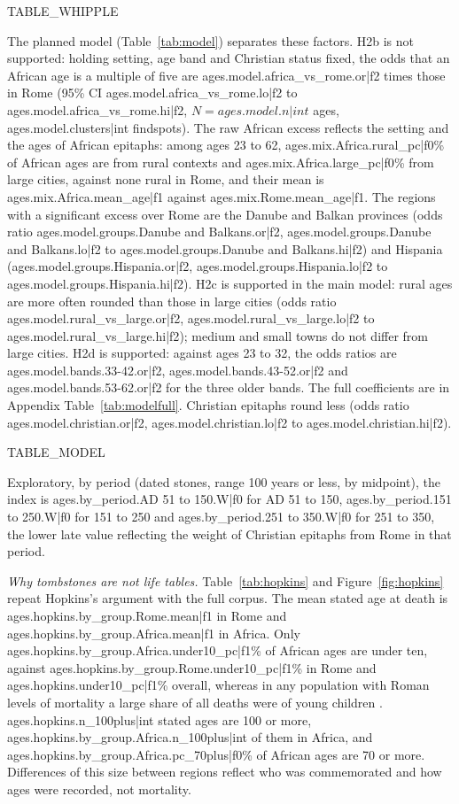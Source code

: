 {{TABLE_WHIPPLE}}

The planned model (Table~\ref{tab:model}) separates these factors. H2b is not supported: holding setting, age band and Christian status fixed, the odds that an African age is a multiple of five are {{ages.model.africa_vs_rome.or|f2}} times those in Rome (95\% CI {{ages.model.africa_vs_rome.lo|f2}} to {{ages.model.africa_vs_rome.hi|f2}}, $N = {{ages.model.n|int}}$ ages, {{ages.model.clusters|int}} findspots). The raw African excess reflects the setting and the ages of African epitaphs: among ages 23 to 62, {{ages.mix.Africa.rural_pc|f0}}\% of African ages are from rural contexts and {{ages.mix.Africa.large_pc|f0}}\% from large cities, against none rural in Rome, and their mean is {{ages.mix.Africa.mean_age|f1}} against {{ages.mix.Rome.mean_age|f1}}. The regions with a significant excess over Rome are the Danube and Balkan provinces (odds ratio {{ages.model.groups.Danube and Balkans.or|f2}}, {{ages.model.groups.Danube and Balkans.lo|f2}} to {{ages.model.groups.Danube and Balkans.hi|f2}}) and Hispania ({{ages.model.groups.Hispania.or|f2}}, {{ages.model.groups.Hispania.lo|f2}} to {{ages.model.groups.Hispania.hi|f2}}). H2c is supported in the main model: rural ages are more often rounded than those in large cities (odds ratio {{ages.model.rural_vs_large.or|f2}}, {{ages.model.rural_vs_large.lo|f2}} to {{ages.model.rural_vs_large.hi|f2}}); medium and small towns do not differ from large cities. H2d is supported: against ages 23 to 32, the odds ratios are {{ages.model.bands.33-42.or|f2}}, {{ages.model.bands.43-52.or|f2}} and {{ages.model.bands.53-62.or|f2}} for the three older bands. The full coefficients are in Appendix Table~\ref{tab:modelfull}. Christian epitaphs round less (odds ratio {{ages.model.christian.or|f2}}, {{ages.model.christian.lo|f2}} to {{ages.model.christian.hi|f2}}).

{{TABLE_MODEL}}

Exploratory, by period (dated stones, range 100 years or less, by midpoint), the index is {{ages.by_period.AD 51 to 150.W|f0}} for AD 51 to 150, {{ages.by_period.151 to 250.W|f0}} for 151 to 250 and {{ages.by_period.251 to 350.W|f0}} for 251 to 350, the lower late value reflecting the weight of Christian epitaphs from Rome in that period.

\textit{Why tombstones are not life tables.} Table~\ref{tab:hopkins} and Figure~\ref{fig:hopkins} repeat Hopkins's argument with the full corpus. The mean stated age at death is {{ages.hopkins.by_group.Rome.mean|f1}} in Rome and {{ages.hopkins.by_group.Africa.mean|f1}} in Africa. Only {{ages.hopkins.by_group.Africa.under10_pc|f1}}\% of African ages are under ten, against {{ages.hopkins.by_group.Rome.under10_pc|f1}}\% in Rome and {{ages.hopkins.under10_pc|f1}}\% overall, whereas in any population with Roman levels of mortality a large share of all deaths were of young children \citep{hopkins1966,scheidel2001}. {{ages.hopkins.n_100plus|int}} stated ages are 100 or more, {{ages.hopkins.by_group.Africa.n_100plus|int}} of them in Africa, and {{ages.hopkins.by_group.Africa.pc_70plus|f0}}\% of African ages are 70 or more. Differences of this size between regions reflect who was commemorated and how ages were recorded, not mortality.

